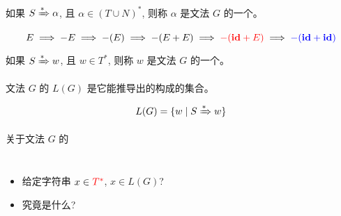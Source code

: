 \begin{frame}{}
  \begin{definition}
    如果 $S \xRightarrow[]{\ast} \alpha$, 且 $\alpha \in (T \cup N)^{\ast}$,
    则称 $\alpha$ 是文法 $G$ 的一个。
  \end{definition}

  \vspace{0.30cm}
  

  \vspace{-0.80cm}
  \[
    E \implies -E \implies -(E) \implies -(E + E)
      \implies \textcolor{red}{-(\text{\bf id} + E)} \implies \textcolor{blue}{-(\text{\bf id} + \text{\bf id})}
  \]

  \pause
  \vspace{0.30cm}
  \begin{definition}[Sentence; 句子]
    如果 $S \xRightarrow[]{\ast} w$, 且 $w \in T^{\ast}$,
    则称 $w$ 是文法 $G$ 的一个。
  \end{definition}
\end{frame}

\begin{frame}{}
  \begin{definition}[文法$G$生成的语言 $L(G)$]
    文法 $G$ 的 $L(G)$ 是它能推导出的构成的集合。

    \[
      L(G) = \{w \mid S \xRightarrow[]{\ast} w\}
    \]
  \end{definition}
\end{frame}

\begin{frame}{}
  \begin{center}
    关于文法 $G$ 的
  \end{center}

  \vspace{0.60cm}
  \begin{columns}
      \begin{itemize}
        \setlength{\itemsep}{15pt}
        \item {}
          给定字符串 $x \in \textcolor{red}{T^{\ast}}$, $x \in L(G)$?
        \item {} 究竟是什么?
      \end{itemize}
  \end{columns}
\end{frame}


